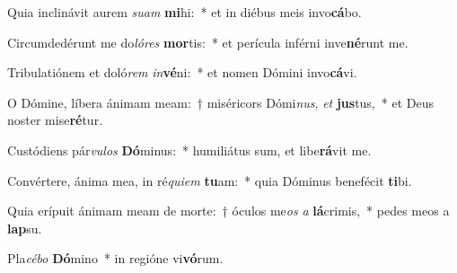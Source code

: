 \item Quia inclinávit aurem \textit{su}\textit{am} \textbf{mi}hi:~* et in diébus meis invo\textbf{cá}bo.
\item Circumdedérunt me do\textit{ló}\textit{res} \textbf{mor}tis:~* et perícula inférni inve\textbf{né}runt me.
\item Tribulatiónem et doló\textit{rem} \textit{in}\textbf{vé}ni:~* et nomen Dómini invo\textbf{cá}vi.
\item O Dómine, líbera ánimam meam:~† miséricors Dómi\textit{nus}, \textit{et} \textbf{jus}tus,~* et Deus noster mise\textbf{ré}tur.
\item Custódiens pár\textit{vu}\textit{los} \textbf{Dó}minus:~* humiliátus sum, et libe\textbf{rá}vit me.
\item Convértere, ánima mea, in ré\textit{qui}\textit{em} \textbf{tu}am:~* quia Dóminus benefécit \textbf{ti}bi.
\item Quia erípuit ánimam meam de morte:~† óculos me\textit{os} \textit{a} \textbf{lá}crimis,~* pedes meos a \textbf{lap}su.
\item Pla\textit{cé}\textit{bo} \textbf{Dó}mino~* in regióne vi\textbf{vó}rum.
